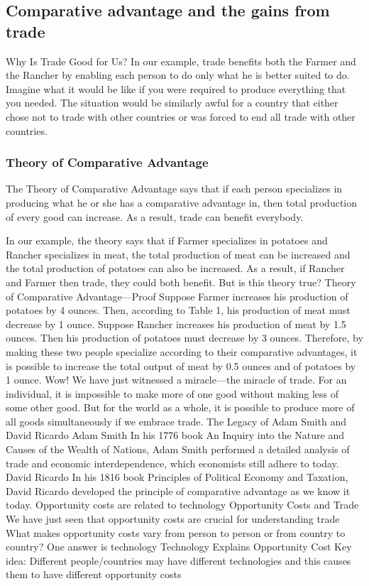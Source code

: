 \documentclass[
  letterpaper,
]{book}
\begin{document}
\subsection{Comparative advantage and the gains from
trade}\label{comparative-advantage-and-the-gains-from-trade}

Why Is Trade Good for Us? In our example, trade benefits both the Farmer
and the Rancher by enabling each person to do only what he is better
suited to do. Imagine what it would be like if you were required to
produce everything that you needed. The situation would be similarly
awful for a country that either chose not to trade with other countries
or was forced to end all trade with other countries.

\subsubsection{Theory of Comparative
Advantage}\label{theory-of-comparative-advantage}

The Theory of Comparative Advantage says that if each person specializes
in producing what he or she has a comparative advantage in, then total
production of every good can increase. As a result, trade can benefit
everybody.

In our example, the theory says that if Farmer specializes in potatoes
and Rancher specializes in meat, the total production of meat can be
increased and the total production of potatoes can also be increased. As
a result, if Rancher and Farmer then trade, they could both benefit. But
is this theory true? Theory of Comparative Advantage---Proof Suppose
Farmer increases his production of potatoes by 4 ounces. Then, according
to Table 1, his production of meat must decrease by 1 ounce. Suppose
Rancher increases his production of meat by 1.5 ounces. Then his
production of potatoes must decrease by 3 ounces. Therefore, by making
these two people specialize according to their comparative advantages,
it is possible to increase the total output of meat by 0.5 ounces and of
potatoes by 1 ounce. Wow! We have just witnessed a miracle---the miracle
of trade. For an individual, it is impossible to make more of one good
without making less of some other good. But for the world as a whole, it
is possible to produce more of all goods simultaneously if we embrace
trade. The Legacy of Adam Smith and David Ricardo Adam Smith In his 1776
book An Inquiry into the Nature and Causes of the Wealth of Nations,
Adam Smith performed a detailed analysis of trade and economic
interdependence, which economists still adhere to today. David Ricardo
In his 1816 book Principles of Political Economy and Taxation, David
Ricardo developed the principle of comparative advantage as we know it
today. Opportunity costs are related to technology Opportunity Costs and
Trade We have just seen that opportunity costs are crucial for
understanding trade What makes opportunity costs vary from person to
person or from country to country? One answer is technology Technology
Explains Opportunity Cost Key idea: Different people/countries may have
different technologies and this causes them to have different
opportunity costs
\end{document}
